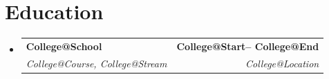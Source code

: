 \documentclass[letterpaper,11pt]{article}
\makeatletter
\newcommand{\resumeSubheading}[4]{
  \vspace{-2pt}\item
    \begin{tabular*}{1.0\textwidth}[t]{l@{\extracolsep{\fill}}r}
      \textbf{#1} & \textbf{\small #2} \\
      \textit{\small#3} & \textit{\small #4} \\
    \end{tabular*}\vspace{-7pt}
}
\newcommand{\resumeProjectHeading}[2]{
    \item
    \begin{tabular*}{1.001\textwidth}{l@{\extracolsep{\fill}}r}
      \small#1 & \textbf{\small #2}\\
    \end{tabular*}\vspace{-7pt}
}
\newcommand{\resumeSubHeadingListStart}{\begin{itemize}[leftmargin=0.0in, label={}]}
\newcommand{\resumeSubHeadingListEnd}{\end{itemize}}
\makeatother
\begin{document}
\section{Education}
  \resumeSubHeadingListStart
      \resumeSubheading
        {\csname College@School\endcsname}
        {\csname College@Start\endcsname -- \csname College@End\endcsname}
        {\csname College@Course\endcsname, \csname College@Stream\endcsname}
        {\csname College@Location\endcsname}  %
  \resumeSubHeadingListEnd

\newcommand{\renderHck}[1]{
      \resumeProjectHeading
      {\textbf{\csname #1@Title\endcsname} $|$ \csname #1@Position\endcsname}
      {\csname #1@Date\endcsname}
      \csname #1@Highlights\endcsname
}
\end{document}
